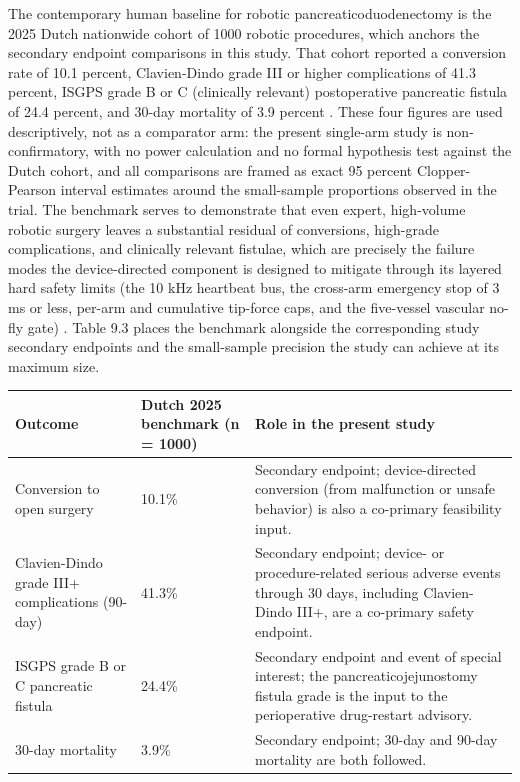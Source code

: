 The contemporary human baseline for robotic pancreaticoduodenectomy is the 2025
Dutch nationwide cohort of 1000 robotic procedures, which anchors the secondary
endpoint comparisons in this study. That cohort reported a conversion rate of 10.1
percent, Clavien-Dindo grade III or higher complications of 41.3 percent, ISGPS
grade B or C (clinically relevant) postoperative pancreatic fistula of 24.4
percent, and 30-day mortality of 3.9 percent \cite{onpremwhippl}. These four
figures are used descriptively, not as a comparator arm: the present single-arm
study is non-confirmatory, with no power calculation and no formal hypothesis test
against the Dutch cohort, and all comparisons are framed as exact 95 percent
Clopper-Pearson interval estimates around the small-sample proportions observed in
the trial. The benchmark serves to demonstrate that even expert, high-volume
robotic surgery leaves a substantial residual of conversions, high-grade
complications, and clinically relevant fistulae, which are precisely the failure
modes the device-directed component is designed to mitigate through its layered
hard safety limits (the 10 kHz heartbeat bus, the cross-arm emergency stop of 3 ms
or less, per-arm and cumulative tip-force caps, and the five-vessel vascular no-fly
gate) \cite{daraxwhipple}. Table 9.3 places the benchmark alongside the
corresponding study secondary endpoints and the small-sample precision the study
can achieve at its maximum size.

\vspace{0.2em}
\noindent\begin{tabularx}{\textwidth}{L{4.6cm} C{2.6cm} Y}
\toprule
\textbf{Outcome} & \textbf{Dutch 2025 benchmark (n = 1000)} & \textbf{Role in the present study} \\
\midrule
Conversion to open surgery & 10.1\% & Secondary endpoint; device-directed conversion (from malfunction or unsafe behavior) is also a co-primary feasibility input. \\
Clavien-Dindo grade III+ complications (90-day) & 41.3\% & Secondary endpoint; device- or procedure-related serious adverse events through 30 days, including Clavien-Dindo III+, are a co-primary safety endpoint. \\
ISGPS grade B or C pancreatic fistula & 24.4\% & Secondary endpoint and event of special interest; the pancreaticojejunostomy fistula grade is the input to the perioperative drug-restart advisory. \\
30-day mortality & 3.9\% & Secondary endpoint; 30-day and 90-day mortality are both followed. \\
\bottomrule
\end{tabularx}
\vspace{-0.2cm}

